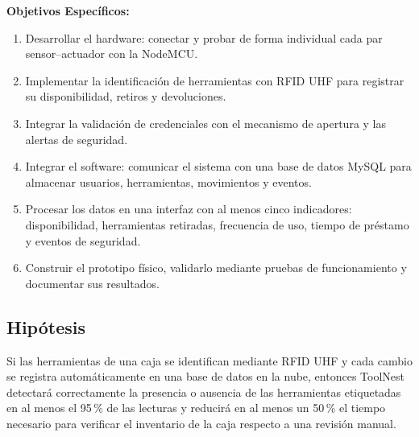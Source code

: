 \textbf{Objetivos Específicos:}
\begin{enumerate}[leftmargin=1.5em, label=\arabic*.]
    \item Desarrollar el hardware: conectar y probar de forma individual cada par sensor--actuador con la NodeMCU.
    \item Implementar la identificación de herramientas con RFID UHF para registrar su disponibilidad, retiros y devoluciones.
    \item Integrar la validación de credenciales con el mecanismo de apertura y las alertas de seguridad.
    \item Integrar el software: comunicar el sistema con una base de datos MySQL para almacenar usuarios, herramientas, movimientos y eventos.
    \item Procesar los datos en una interfaz con al menos cinco indicadores: disponibilidad, herramientas retiradas, frecuencia de uso, tiempo de préstamo y eventos de seguridad.
    \item Construir el prototipo físico, validarlo mediante pruebas de funcionamiento y documentar sus resultados.
\end{enumerate}

\subsection{Hipótesis}
Si las herramientas de una caja se identifican mediante RFID UHF y cada cambio se registra automáticamente en una base de datos en la nube, entonces ToolNest detectará correctamente la presencia o ausencia de las herramientas etiquetadas en al menos el 95\,\% de las lecturas y reducirá en al menos un 50\,\% el tiempo necesario para verificar el inventario de la caja respecto a una revisión manual.
